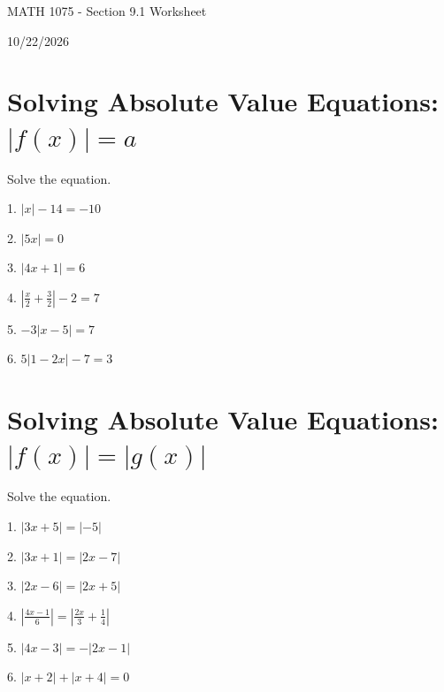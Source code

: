 \documentclass[12pt]{article}
\begin{document}
\vspace*{0.5in}

\begin{center}
    {\LARGE MATH 1075 - Section 9.1 Worksheet}

    \vspace{2em}

    {\large 10/22/2026}
\end{center}
\section{Solving Absolute Value Equations: $|f(x)|=a$}

\vspace{1.5em}
Solve the equation.
\vspace{1.5em}

1. $\lvert x \rvert-14=-10$

\vspace{4.5em}

2. $\lvert 5x \rvert=0$

\vspace{4.5em}

3. $\lvert 4x+1 \rvert=6$

\vspace{4.5em}

4. $\left\vert \frac{x}{2}+\frac{3}{2}   \right\vert-2=7$

\vspace{4.5em}

5. $-3\lvert x-5 \rvert=7$

\vspace{4.5em}

6. $5\lvert 1-2x\rvert-7=3$

\vspace{4.5em}

\newpage 

\section{Solving Absolute Value Equations: $|f(x)|=|g(x)|$}

Solve the equation. 

\vspace{1.5em} 

1. $\lvert 3x+5\rvert=\lvert -5\rvert$

\vspace{4.5em} 

2. $\lvert 3x+1\rvert=\lvert 2x-7\rvert$

\vspace{4.5em} 

3. $\lvert 2x-6\rvert=\lvert 2x+5\rvert$

\vspace{4.5em} 

4. $\left\lvert \frac{4x-1}{6} \right\rvert=\left\lvert \frac{2x}{3}+\frac{1}{4}  \right\rvert$

\vspace{4.5em}

5. $\lvert 4x-3\rvert=-\lvert 2x-1\rvert$

\vspace{4.5em} 

6. $\lvert x+2\rvert+\lvert x+4 \rvert=0$ 
\end{document}
